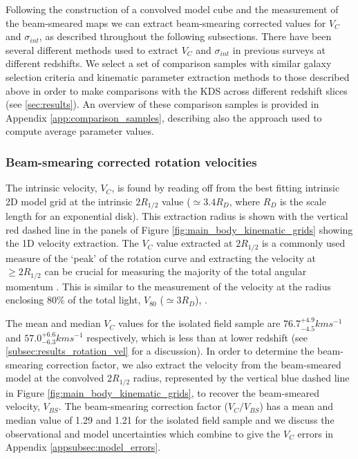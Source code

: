 \documentclass[fleqn,usenatbib]{mn2e}
\begin{document}
Following the construction of a convolved model cube and the measurement of the beam-smeared maps we can extract beam-smearing corrected values for $V_{C}$ and $\sigma_{int}$, as described throughout the following subsections.
There have been several different methods used to extract $V_{C}$ and $\sigma_{int}$ in previous surveys at different redshifts.
We select a set of comparison samples with similar galaxy selection criteria and kinematic parameter extraction methods to those described above in order to make comparisons with the KDS across different redshift slices (see \cref{sec:results}).
An overview of these comparison samples is provided in Appendix \ref{app:comparison_samples}, describing also the approach used to compute average parameter values.

\subsubsection{Beam-smearing corrected rotation velocities}\label{subsubsec:beam_smearing_corrected_velocities}
The intrinsic velocity, $V_{C}$, is found by reading off from the best fitting intrinsic 2D model grid at the intrinsic $2R_{1/2}$ value ($\simeq3.4R_{D}$, where $R_{D}$ is the scale length for an exponential disk).
This extraction radius is shown with the vertical red dashed line in the panels of Figure \ref{fig:main_body_kinematic_grids} showing the 1D velocity extraction.
The $V_{C}$ value extracted at $2R_{1/2}$ is a commonly used measure of the `peak' of the rotation curve \citep[e.g.][]{Miller2011,Stott2016,Pelliccia2017,Harrison2017,Swinbank2017} and extracting the velocity at $\geqslant 2R_{1/2}$ can be crucial for measuring the majority of the total angular momentum \citep[e.g.][]{Obreschkow2015,Harrison2017,Swinbank2017}.
This is similar to the measurement of the velocity at the radius enclosing 80$\%$ of the total light, $V_{80}$ ($\simeq3R_{D}$), \citep{Tiley2016a}.

The mean and median $V_{C}$ values for the isolated field sample are $76.7^{+4.9}_{-4.5}kms^{-1}$ and $57.0^{+6.6}_{-6.3}kms^{-1}$ respectively, which is less than at lower redshift (see \cref{subsec:results_rotation_vel} for a discussion).
In order to determine the beam-smearing correction factor, we also extract the velocity from the beam-smeared model at the convolved $2R_{1/2}$ radius, represented by the vertical blue dashed line in Figure \ref{fig:main_body_kinematic_grids}, to recover the beam-smeared velocity, $V_{BS}$.
The beam-smearing correction factor ($V_{C}/V_{BS}$) has a mean and median value of 1.29 and 1.21 for the isolated field sample and we discuss the observational and model uncertainties which combine to give the $V_{C}$ errors in Appendix \ref{appsubsec:model_errors}. \\
\end{document}
